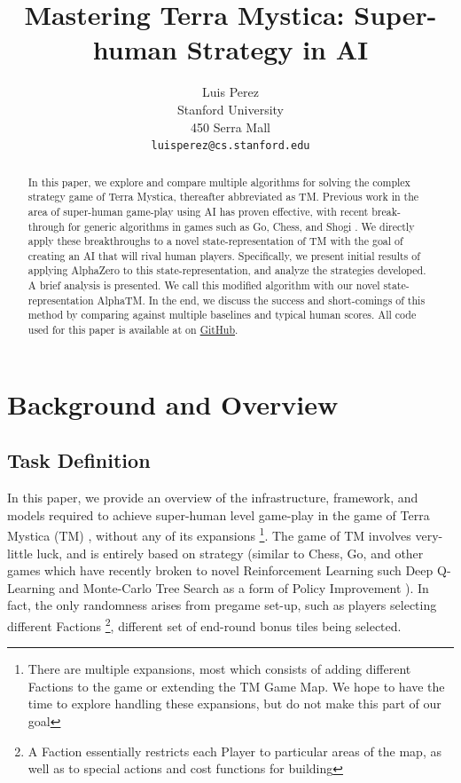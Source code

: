 \documentclass[10pt,twocolumn,letterpaper]{article}
\begin{document}
\title{Mastering Terra Mystica: Super-human Strategy in AI}

\author{
Luis Perez\\
Stanford University\\
450 Serra Mall\\
{\tt\small luisperez@cs.stanford.edu}
}

\maketitle
\thispagestyle{empty}

\begin{abstract}
In this paper, we explore and compare multiple algorithms for solving the complex strategy game of Terra Mystica, thereafter abbreviated as TM. Previous work in the area of super-human game-play using AI has proven effective, with recent break-through for generic algorithms in games such as Go, Chess, and Shogi \cite{AlphaZero}. We directly apply these breakthroughs to a novel state-representation of TM with the goal of creating an AI that will rival human players. Specifically, we present initial results of applying AlphaZero to this state-representation, and analyze the strategies developed. A brief analysis is presented. We call this modified algorithm with our novel state-representation AlphaTM. In the end, we discuss the success and short-comings of this method by comparing against multiple baselines and typical human scores. All code used for this paper is available at on \href{https://github.com/kandluis/terrazero}{GitHub}.

\end{abstract}

\section{Background and Overview}
\label{section:background_and_overview}
\subsection{Task Definition}
\label{section:task_definition}
In this paper, we provide an overview of the infrastructure, framework, and models required to achieve super-human level game-play in the game of Terra Mystica (TM) \cite{TMBoardGeek}, without any of its expansions \footnote{There are multiple expansions, most which consists of adding different Factions to the game or extending the TM Game Map. We hope to have the time to explore handling these expansions, but do not make this part of our goal}. The game of TM involves very-little luck, and is entirely based on strategy (similar to Chess, Go, and other games which have recently broken to novel Reinforcement Learning such Deep Q-Learning and Monte-Carlo Tree Search as a form of Policy Improvement \cite{AlphaGo} \cite{AlphaGoZero}). In fact, the only randomness arises from pregame set-up, such as players selecting different Factions \footnote{A Faction essentially restricts each Player to particular areas of the map, as well as to special actions and cost functions for building}, different set of end-round bonus tiles being selected.
\end{document}
